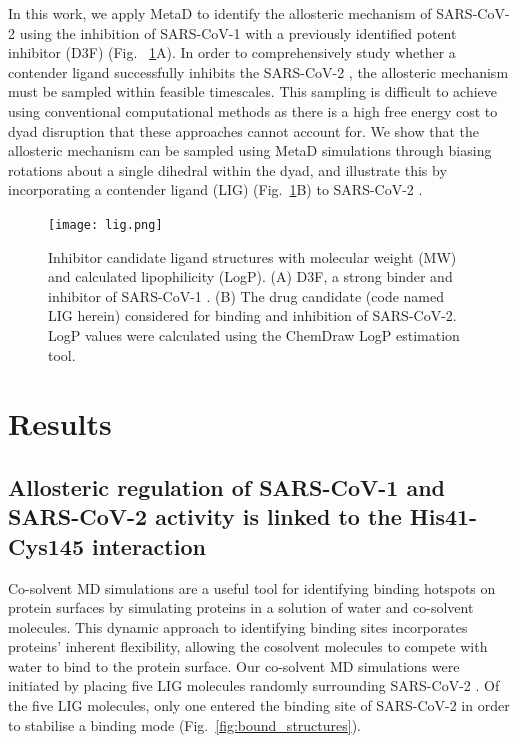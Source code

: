 In this work, we apply MetaD to identify the allosteric mechanism of SARS-CoV-2  using the inhibition of SARS-CoV-1  with a previously identified potent inhibitor (D3F)\cite{d3f} (Fig.~ \ref{fig:structures}A). In order to comprehensively study whether a contender ligand successfully inhibits the SARS-CoV-2 \!\!, the  allosteric mechanism must be sampled within feasible timescales. This sampling is difficult to achieve using conventional computational methods as there is a high free energy cost to dyad disruption that these approaches cannot account for. We show that the allosteric mechanism can be sampled using MetaD simulations through biasing rotations about a single dihedral within the dyad, and illustrate this by incorporating a contender ligand (LIG) (Fig.~\ref{fig:structures}B) to SARS-CoV-2 \!\!.

\begin{figure}
\centering
\texttt{[image: lig.png]}
\caption{Inhibitor candidate ligand structures with molecular weight (MW) and calculated lipophilicity (LogP). (A) D3F, a strong binder and inhibitor of SARS-CoV-1 \!\!. (B) The drug candidate (code named LIG herein) considered for binding and inhibition of SARS-CoV-2. LogP values were calculated using the ChemDraw LogP estimation tool.}
\label{fig:structures}
\end{figure}


\section{Results}

\subsection{Allosteric regulation of SARS-CoV-1 and SARS-CoV-2  activity is linked to the His41-Cys145 interaction}

Co-solvent MD simulations \cite{seco2009binding} are a useful tool for identifying binding hotspots on protein surfaces by simulating proteins in a solution of water and co-solvent molecules. This dynamic approach to identifying binding sites incorporates proteins' inherent flexibility, allowing the cosolvent molecules to compete with water to bind to the protein surface.\cite{ghanakota2016driving} Our co-solvent MD simulations were initiated by placing five LIG molecules randomly surrounding SARS-CoV-2 . Of the five LIG molecules, only one entered the binding site of SARS-CoV-2 in order to stabilise a binding mode (Fig.~\ref{fig:bound_structures}). \\

